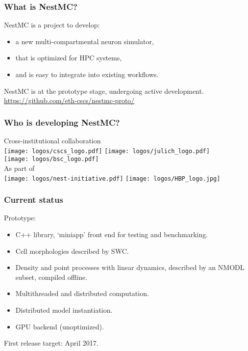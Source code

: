 \documentclass[aspectratio=43,12pt]{beamer}
\author{Sam Yates, CSCS}
\title{\nestmc}
\subtitle{\nestmc: a new multi-compartment neuron simulator}
\date{\today}
\newcommand{\nestmc}{NestMC}
\begin{document}
\cscstitle

\begin{frame}
\frametitle{What is \nestmc?}
\vfill
\nestmc{} is a project to develop:

\vfill
\begin{itemize}
\item a new multi-compartmental neuron simulator,
\item that is optimized for HPC systems,
\item and is easy to integrate into existing workflows.
\end{itemize}
\vfill

\nestmc{} is at the prototype stage, undergoing
active development.\\
\url{https://github.com/eth-cscs/nestmc-proto/}
\vfill

\end{frame}

\begin{frame}
\frametitle{Who is developing \nestmc{}?}
\centering 
\vspace{2ex}
{\large Cross-institutional collaboration}\\[2ex]
\texttt{[image: logos/cscs\_logo.pdf]}
\hspace{15mm}
\texttt{[image: logos/julich\_logo.pdf]}
\hspace*{5mm}
\\[1.4em]
\texttt{[image: logos/bsc\_logo.pdf]}\\

\vfill
{\large As part of}\\[2ex]
\texttt{[image: logos/nest-initiative.pdf]}
\hspace{15mm}
\texttt{[image: logos/HBP\_logo.jpg]}

\vspace*{1em}
\end{frame}

\begin{frame}
\frametitle{Current status}

\vfill
Prototype:
\begin{itemize}
\item C++ library, `miniapp' front end for testing
and benchmarking.
\item Cell morphologies described by SWC.
\item Density and point processes with linear dynamics,
described by an NMODL subset, compiled offline.
\item Multithreaded and distributed computation.
\item Distributed model instantiation.
\item GPU backend (unoptimized).
\end{itemize}
\vfill
First release target: April 2017.
\vfill
\end{frame}
\end{document}
